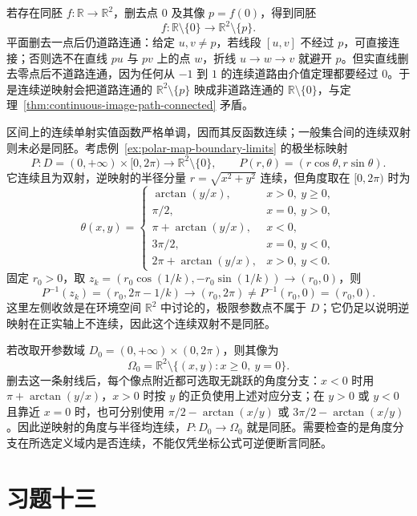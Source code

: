 \documentclass[UTF8,12pt,a4paper,fontset=fandol]{ctexbook}
\begin{document}
\begin{solve}
若存在同胚 $f:\mathbb R\to\mathbb R^2$，删去点 $0$ 及其像 $p=f(0)$，得到同胚
\[
    f:\mathbb R\setminus\{0\}\longrightarrow\mathbb R^2\setminus\{p\}.
\]
平面删去一点后仍道路连通：给定 $u,v\neq p$，若线段 $[u,v]$ 不经过 $p$，可直接连接；否则选不在直线 $pu$ 与 $pv$ 上的点 $w$，折线 $u\to w\to v$ 就避开 $p$。但实直线删去零点后不道路连通，因为任何从 $-1$ 到 $1$ 的连续道路由介值定理都要经过 $0$。于是连续逆映射会把道路连通的 $\mathbb R^2\setminus\{p\}$ 映成非道路连通的 $\mathbb R\setminus\{0\}$，与定理~\ref{thm:continuous-image-path-connected} 矛盾。
\end{solve}

区间上的连续单射实值函数严格单调，因而其反函数连续；一般集合间的连续双射则未必是同胚。考虑例~\ref{ex:polar-map-boundary-limits} 的极坐标映射
\[
    P:D=(0,+\infty)\times[0,2\pi)\longrightarrow
          \mathbb R^2\setminus\{0\},\qquad
    P(r,\theta)=(r\cos\theta,r\sin\theta).
\]
它连续且为双射，逆映射的半径分量 $r=\sqrt{x^2+y^2}$ 连续，但角度取在 $[0,2\pi)$ 时为
\[
    \theta(x,y)=\begin{cases}
        \arctan(y/x),&x>0,\ y\geq0,\\
        \pi/2,&x=0,\ y>0,\\
        \pi+\arctan(y/x),&x<0,\\
        3\pi/2,&x=0,\ y<0,\\
        2\pi+\arctan(y/x),&x>0,\ y<0.
    \end{cases}
\]
固定 $r_0>0$，取 $z_k=(r_0\cos(1/k),-r_0\sin(1/k))\to(r_0,0)$，则
\[
    P^{-1}(z_k)=(r_0,2\pi-1/k)\to(r_0,2\pi)
       \neq P^{-1}(r_0,0)=(r_0,0).
\]
这里左侧收敛是在环境空间 $\mathbb R^2$ 中讨论的，极限参数点不属于 $D$；它仍足以说明逆映射在正实轴上不连续，因此这个连续双射不是同胚。

若改取开参数域 $D_0=(0,+\infty)\times(0,2\pi)$，则其像为
\[
    \Omega_0=\mathbb R^2\setminus\{(x,y):x\geq0,\ y=0\}.
\]
删去这一条射线后，每个像点附近都可选取无跳跃的角度分支：$x<0$ 时用 $\pi+\arctan(y/x)$，$x>0$ 时按 $y$ 的正负使用上述对应分支；在 $y>0$ 或 $y<0$ 且靠近 $x=0$ 时，也可分别使用 $\pi/2-\arctan(x/y)$ 或 $3\pi/2-\arctan(x/y)$。因此逆映射的角度与半径均连续，$P:D_0\to\Omega_0$ 就是同胚。需要检查的是角度分支在所选定义域内是否连续，不能仅凭坐标公式可逆便断言同胚。

\section*{习题十三}
\end{document}
